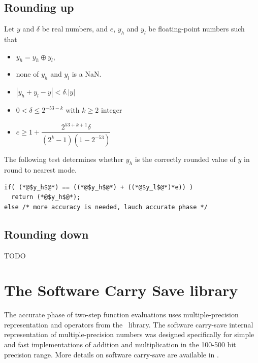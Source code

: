 \subsection{Rounding up}

\begin{theorem}
  Let $y$ and $\delta$ be real numbers, and $e$, $y_h$ and $y_l$ be
  floating-point numbers such that 
  \begin{itemize}
  \item $y_h=y_h\oplus y_l$,
  \item none of $y_h$ and $y_l$ is a  NaN.
  \item $|y_h+y_l - y| < \delta.|y|$
  \item $0< \delta \le 2^{-53-k}$ with $k\ge 2$ integer
  \item $e\ge 1+  \dfrac{2^{53+k+1}\delta}{(2^{k}-1)(1-2^{-53})}$
\end{itemize}

The following test determines whether $y_h$ is the
  correctly rounded value of $y$ in  round to nearest mode.

\begin{lstlisting}[label={roundingtonearest},
  caption={Test for correct rounding to nearest},
  firstnumber=1]
if( (*@$y_h$@*) == ((*@$y_h$@*) + ((*@$y_l$@*)*e)) )
  return (*@$y_h$@*);
else /* more accuracy is needed, lauch accurate phase */
\end{lstlisting}
\end{theorem}

\subsection{Rounding down}

TODO







\section{The Software Carry Save library}

The accurate phase of two-step function evaluations uses
multiple-precision representation and operators from the \scslib\ 
library.  The software carry-save internal representation of
multiple-precision numbers was designed specifically for simple and
fast implementations of addition and multiplication in the 100-500 bit
precision range. More details on software carry-save are available in
\cite{DefDin2002,DinDef2003}.

